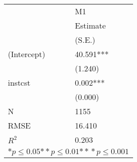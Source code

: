 \begin{tabular}{*{2}{l}}
\hline
                  & M1   \tabularnewline
                   &Estimate \tabularnewline
                 &(S.E.) \tabularnewline
 \hline
 \hline
   (Intercept)     &40.591*** \tabularnewline
                 &(1.240)  \tabularnewline
   instcst         &0.002*** \tabularnewline
                 &(0.000)  \tabularnewline
 \hline
 N                 &1155       \tabularnewline
 RMSE             &16.410   \tabularnewline
 $R^2$             &0.203   \tabularnewline
 \hline
\hline
 
 \multicolumn{2}{c}{${*  p}\le 0.05$${*\!\!*  p}\le 0.01$${*\!\!*\!\!*  p}\le 0.001$}\tabularnewline
 \end{tabular}